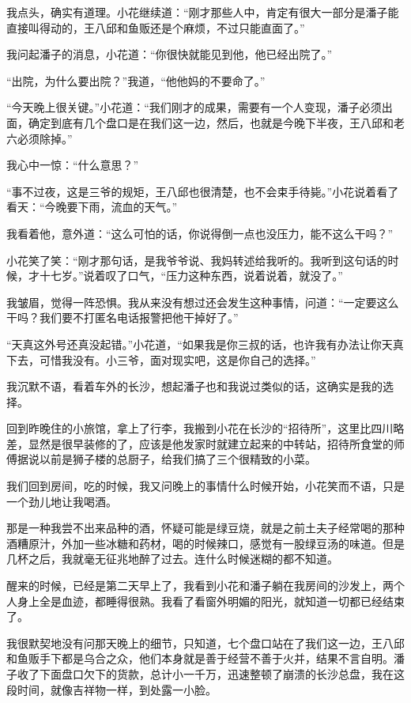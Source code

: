 我点头，确实有道理。小花继续道：“刚才那些人中，肯定有很大一部分是潘子能直接叫得动的，王八邱和鱼贩还是个麻烦，不过只能直面了。”

我问起潘子的消息，小花道：“你很快就能见到他，他已经出院了。”

“出院，为什么要出院？”我道，“他他妈的不要命了。”

“今天晚上很关键。”小花道：“我们刚才的成果，需要有一个人变现，潘子必须出面，确定到底有几个盘口是在我们这一边，然后，也就是今晚下半夜，王八邱和老六必须除掉。”

我心中一惊：“什么意思？”

“事不过夜，这是三爷的规矩，王八邱也很清楚，也不会束手待毙。”小花说着看了看天：“今晚要下雨，流血的天气。”

我看着他，意外道：“这么可怕的话，你说得倒一点也没压力，能不这么干吗？”

小花笑了笑：“刚才那句话，是我爷爷说、我妈转述给我听的。我听到这句话的时候，才十七岁。”说着叹了口气，“压力这种东西，说着说着，就没了。”

我皱眉，觉得一阵恐惧。我从来没有想过还会发生这种事情，问道：“一定要这么干吗？我们要不打匿名电话报警把他干掉好了。”

“天真这外号还真没起错。”小花道，“如果我是你三叔的话，也许我有办法让你天真下去，可惜我没有。小三爷，面对现实吧，这是你自己的选择。”

我沉默不语，看着车外的长沙，想起潘子也和我说过类似的话，这确实是我的选择。

回到昨晚住的小旅馆，拿上了行李，我搬到小花在长沙的“招待所”，这里比四川略差，显然是很早装修的了，应该是他发家时就建立起来的中转站，招待所食堂的师傅据说以前是狮子楼的总厨子，给我们搞了三个很精致的小菜。

我们回到房间，吃的时候，我又问晚上的事情什么时候开始，小花笑而不语，只是一个劲儿地让我喝酒。

那是一种我尝不出来品种的酒，怀疑可能是绿豆烧，就是之前土夫子经常喝的那种酒糟原汁，外加一些冰糖和药材，喝的时候辣口，感觉有一股绿豆汤的味道。但是几杯之后，我就毫无征兆地醉了过去。连什么时候迷糊的都不知道。

醒来的时候，已经是第二天早上了，我看到小花和潘子躺在我房间的沙发上，两个人身上全是血迹，都睡得很熟。我看了看窗外明媚的阳光，就知道一切都已经结束了。

我很默契地没有问那天晚上的细节，只知道，七个盘口站在了我们这一边，王八邱和鱼贩手下都是乌合之众，他们本身就是善于经营不善于火并，结果不言自明。潘子收了下面盘口欠下的货款，总计小一千万，迅速整顿了崩溃的长沙总盘，我在这段时间，就像吉祥物一样，到处露一小脸。

